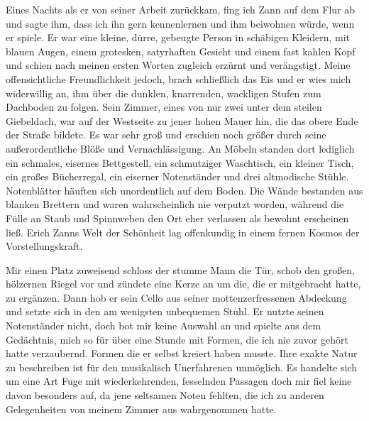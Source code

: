 \documentclass[a4paper]{memoir}
\begin{document}
Eines Nachts als er von seiner Arbeit zurückkam, fing ich Zann auf dem Flur ab und sagte ihm, dass ich ihn gern kennenlernen und ihm beiwohnen würde, wenn er spiele. Er war eine kleine, dürre, gebeugte Person in schäbigen Kleidern, mit blauen Augen, einem grotesken, satyrhaften Gesicht und einem fast kahlen Kopf und schien nach meinen ersten Worten zugleich erzürnt und verängstigt. Meine offensichtliche Freundlichkeit jedoch, brach schließlich das Eis und er wies mich widerwillig an, ihm über die dunklen, knarrenden, wackligen Stufen zum Dachboden zu folgen. Sein Zimmer, eines von nur zwei unter dem steilen Giebeldach, war auf der Westseite zu jener hohen Mauer hin, die das obere Ende der Straße bildete. Es war sehr groß und erschien noch größer durch seine außerordentliche Blöße und Vernachlässigung. An Möbeln standen dort lediglich ein schmales, eisernes Bettgestell, ein schmutziger Waschtisch, ein kleiner Tisch, ein großes Bücherregal, ein eiserner Notenständer und drei altmodische Stühle. Notenblätter häuften sich unordentlich auf dem Boden. Die Wände bestanden aus blanken Brettern und waren wahrscheinlich nie verputzt worden, während die Fülle an Staub und Spinnweben den Ort eher verlassen als bewohnt erscheinen ließ. Erich Zanns Welt der Schönheit lag offenkundig in einem fernen Kosmos der Vorstellungskraft.

Mir einen Platz zuweisend schloss der stumme Mann die Tür, schob den großen, hölzernen Riegel vor und zündete eine Kerze an um die, die er mitgebracht hatte, zu ergänzen. Dann hob er sein Cello aus seiner mottenzerfressenen Abdeckung und setzte sich in den am wenigsten unbequemen Stuhl. Er nutzte seinen Notenständer nicht, doch bot mir keine Auswahl an und spielte aus dem Gedächtnis, mich so für über eine Stunde mit Formen, die ich nie zuvor gehört hatte verzaubernd. Formen die er selbst kreiert haben musste. Ihre exakte Natur zu beschreiben ist für den musikalisch Unerfahrenen unmöglich. Es handelte sich um eine Art Fuge mit wiederkehrenden, fesselnden Passagen doch mir fiel keine davon besonders auf, da jene seltsamen Noten fehlten, die ich zu anderen Gelegenheiten von meinem Zimmer aus wahrgenommen hatte.
\end{document}
